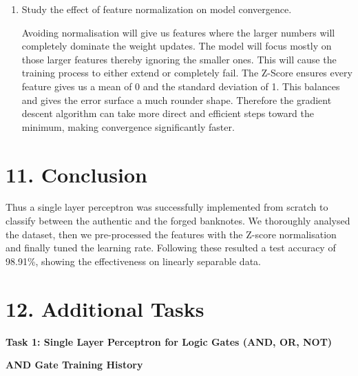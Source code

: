 \documentclass[11pt]{article}
\begin{document}
\begin{enumerate}[leftmargin=*]
A single layer perceptron is basically like a linear classifier i.e. it can  draw a straight line to separate data points. If we plot the inputs for a XOR gate, the outputs of `1' are opposite from each other and the outputs of `0' are also diagonally opposite from each other. We cannot draw a straight line across a graph to separate the 1's from the 0's. We see that the data is not linearly separable and so the perceptron fails. Instead we need to draw multiple lines.

\item Study the effect of feature normalization on model convergence.

Avoiding normalisation will give us features where the larger numbers will completely dominate the weight updates. The model will focus mostly on those larger features thereby ignoring the smaller ones. This will cause the training process to either extend or completely fail. The Z-Score ensures every feature gives us a mean of 0 and the standard deviation of 1. This balances and gives the error surface a much rounder shape. Therefore the gradient descent algorithm can take more direct and efficient steps toward the minimum, making convergence significantly faster.

\end{enumerate}


\section*{11. Conclusion}

Thus a single layer perceptron was successfully implemented from scratch to classify between the authentic and the forged banknotes. We thoroughly analysed the dataset, then we pre-processed the features with the Z-score normalisation and finally tuned the learning rate. Following these resulted a  test accuracy of 98.91\%, showing the effectiveness on linearly separable data.


\section*{12. Additional Tasks}

\textbf{Task 1: Single Layer Perceptron for Logic Gates (AND, OR, NOT)}

\vspace{4mm}
\noindent\textbf{AND Gate Training History}
\end{document}
